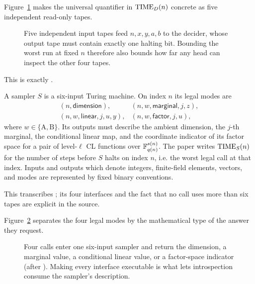 Figure~\ref{fig:C-decider-five-tapes} makes the universal quantifier in
\(\operatorname{TIME}_D(n)\) concrete as five independent read-only tapes.
\begin{figure}[t]
\centering

\caption{Five independent input tapes feed \(n,x,y,a,b\) to the decider, whose output tape must contain exactly one halting bit.  Bounding the worst run at fixed \(n\) therefore also bounds how far any head can inspect the other four tapes.}
\label{fig:C-decider-five-tapes}
\end{figure}

This is exactly .

\begin{definition}
\label{def:paper-sampler}
A sampler \(S\) is a six-input Turing machine.  On index \(n\) its legal modes
are
\[
\begin{array}{ll}
(n,\mathsf{dimension}),&
(n,w,\mathsf{marginal},j,z),\\
(n,w,\mathsf{linear},j,u,y),&
(n,w,\mathsf{factor},j,u),
\end{array}
\]
where \(w\in\{\mathrm A,\mathrm B\}\).  Its outputs must describe the ambient
dimension, the \(j\)-th marginal, the conditional linear map, and the
coordinate indicator of its factor space for a pair of level-\(\ell\) CL
functions over \(\mathbb F_{q(n)}^{s(n)}\).  The paper writes \(\operatorname{TIME}_S(n)\) for the
number of steps before \(S\) halts on index \(n\), i.e. the worst legal call
at that index.  Inputs and outputs which denote integers, finite-field
elements, vectors, and modes are represented by fixed binary conventions.
\end{definition}

This transcribes ; its four interfaces and the fact that no
call uses more than six tapes are explicit in the source.

Figure~\ref{fig:sampler-four-queries} separates the four legal modes by the
mathematical type of the answer they request.
\begin{figure}[t]
\centering

\caption{Four calls enter one six-input sampler and return the dimension, a marginal value, a conditional linear value, or a factor-space indicator (after ).  Making every interface executable is what lets introspection consume the sampler's description.}
\label{fig:sampler-four-queries}
\end{figure}

